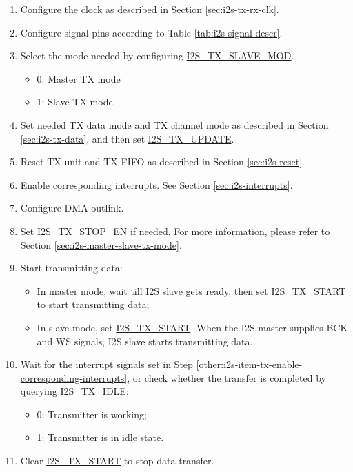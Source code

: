 \documentclass[main\_\_EN.tex]{subfiles}
\begin{document}
\begin{enumerate}
    \item Configure the clock as described in Section \ref{sec:i2s-tx-rx-clk}.
    \item Configure signal pins according to Table \ref{tab:i2s-signal-descr}.
    \item Select the mode needed by configuring \hyperref[fielddesc:I2STXSLAVEMOD]{I2S\_TX\_SLAVE\_MOD}.
    \begin{itemize}
        \item 0: Master TX mode
        \item 1: Slave TX mode
    \end{itemize}
    \item Set needed TX data mode and TX channel mode as described in Section \ref{sec:i2s-tx-data}, and then set \hyperref[fielddesc:I2STXUPDATE]{I2S\_TX\_UPDATE}.
    \item Reset TX unit and TX FIFO as described in Section \ref{sec:i2s-reset}.
    \item Enable corresponding interrupts. See Section \ref{sec:i2s-interrupts}.\label{other:i2s-item-tx-enable-corresponding-interrupts}
    \item Configure DMA outlink. 
    \item Set \hyperref[fielddesc:I2STXSTOPEN]{I2S\_TX\_STOP\_EN} if needed. For more information, please refer to Section \ref{sec:i2s-master-slave-tx-mode}. 
    \item Start transmitting data:
    \begin{itemize}
        \item In master mode, wait till I2S slave gets ready, then set \hyperref[fielddesc:I2STXSTART]{I2S\_TX\_START} to start transmitting data;
        \item In slave mode, set \hyperref[fielddesc:I2STXSTART]{I2S\_TX\_START}. When the I2S master supplies BCK and WS signals, I2S slave starts transmitting data.
    \end{itemize}
    \item Wait for the interrupt signals set in Step \ref{other:i2s-item-tx-enable-corresponding-interrupts}, or check whether the transfer is completed by querying \hyperref[fielddesc:I2STXIDLE]{I2S\_TX\_IDLE}:
    \begin{itemize}
        \item 0: Transmitter is working;
        \item 1: Transmitter is in idle state.
    \end{itemize}
    \item Clear \hyperref[fielddesc:I2STXSTART]{I2S\_TX\_START} to stop data transfer.
\end{enumerate}
\end{document}
